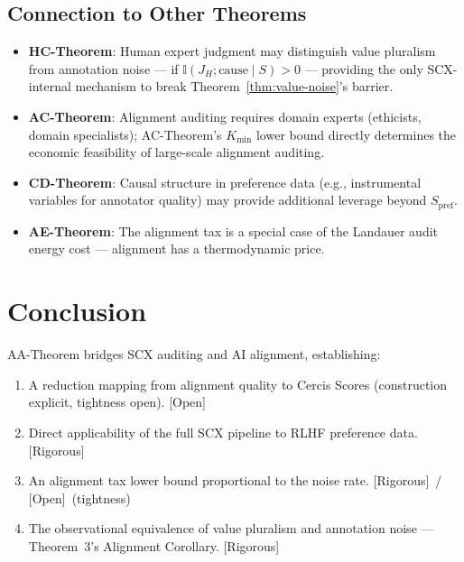 \documentclass[12pt,a4paper]{article}
\newcommand{\rigorous}{\textcolor{green!50!black}{\small\textsf{[Rigorous]}}}
\newcommand{\openquest}{\textcolor{red!70!black}{\small\textsf{[Open]}}}
\newcommand{\I}{\mathbb{I}}
\begin{document}
\subsection{Connection to Other Theorems}

\begin{itemize}
    \item \textbf{HC-Theorem}: Human expert judgment may distinguish value
          pluralism from annotation noise — if $\I(J_H;\text{cause}\mid S)>0$ —
          providing the only SCX-internal mechanism to break
          Theorem~\ref{thm:value-noise}'s barrier.
    \item \textbf{AC-Theorem}: Alignment auditing requires domain experts
          (ethicists, domain specialists); AC-Theorem's $K_{\min}$ lower bound
          directly determines the economic feasibility of large-scale alignment
          auditing.
    \item \textbf{CD-Theorem}: Causal structure in preference data (e.g.,
          instrumental variables for annotator quality) may provide additional
          leverage beyond $S_{\mathrm{pref}}$.
    \item \textbf{AE-Theorem}: The alignment tax is a special case of the
          Landauer audit energy cost — alignment has a thermodynamic price.
\end{itemize}

\section{Conclusion}

AA-Theorem bridges SCX auditing and AI alignment, establishing:
\begin{enumerate}[label=(\arabic*)]
    \item A reduction mapping from alignment quality to Cercis Scores
          (construction explicit, tightness open).  \openquest
    \item Direct applicability of the full SCX pipeline to RLHF preference
          data.  \rigorous
    \item An alignment tax lower bound proportional to the noise rate.
          \rigorous~/ \openquest~(tightness)
    \item The observational equivalence of value pluralism and annotation noise
          — Theorem~3's Alignment Corollary.  \rigorous
\end{enumerate}
\end{document}
